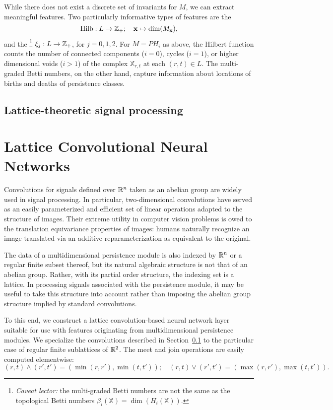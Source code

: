 \documentclass{article}
\begin{document}

While there does not exist a discrete set of invariants for $M$, we can extract
meaningful features. Two particularly informative types of features are 
 the 
  \[\text{Hilb}: L \to \mathbb{Z}_+;\quad \mathbf{x} \mapsto \dim(M_\mathbf{x}),\] and
the \footnote{\textit{Caveat lector:} the
multi-graded Betti numbers are not the same as the topological Betti numbers
$\beta_i(\mathbb{X}) = \dim(H_i(\mathbb{X}))$.} $\xi_j: L \to \mathbb{Z}_+$, for $j =
0,1,2$. For $M = PH_i$ as above, the Hilbert function counts the number of
connected components ($i=0$), cycles ($i=1$), or higher dimensional voids ($i >
1$) of the complex $\mathbb{X}_{r,t}$ at each $(r,t) \in L$. The multi-graded
Betti numbers, on the other hand, capture information about locations of births
and deaths of persistence classes.

\subsection{Lattice-theoretic signal processing}\label{sec:latticeconv}

\cite{pueschel_discrete_2019}
\section{Lattice Convolutional Neural Networks}\label{sec:latticeCNN}

Convolutions for signals defined over $\mathbb{R}^n$ taken as an abelian group are
widely used in signal processing. In particular, two-dimensional convolutions
have served as an easily parameterized and efficient set of linear operations
adapted to the structure of images. Their extreme utility in computer vision
problems is owed to the translation equivariance properties of images: humans
naturally recognize an image translated via an additive reparameterization as
equivalent to the original.

The data of a multidimensional persistence module is also indexed by $\mathbb{R}^n$ or a
regular finite subset thereof, but its natural algebraic structure is not that
of an abelian group. Rather, with its partial order structure, the indexing set
is a lattice. In processing signals associated with the persistence module, it
may be useful to take this structure into account rather than imposing the
abelian group structure implied by standard convolutions.

To this end, we construct a lattice convolution-based neural network layer
suitable for use with features originating from multidimensional persistence
modules. We specialize the convolutions described in
Section~\ref{sec:latticeconv} to the particular case of regular finite
sublattices of $\mathbb{R}^2$. The meet and join operations are easily computed
elementwise:
\[(r,t) \wedge (r',t') = (\min(r,r'),\min(t,t'));\quad (r,t)\vee (r',t') =
  (\max(r,r'),\max(t,t')).\]
\end{document}
